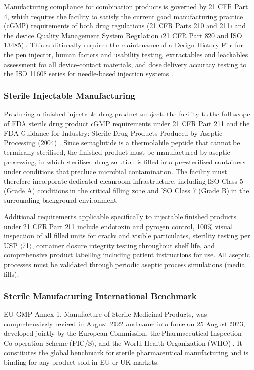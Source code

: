 Manufacturing compliance for combination products is governed by 21 CFR Part 4, which requires the facility to satisfy the current good manufacturing practice (cGMP) requirements of both drug regulations (21 CFR Parts 210 and 211) and the device Quality Management System Regulation (21 CFR Part 820 and ISO 13485) \cite{eCFR_Part4}. This additionally requires the maintenance of a Design History File for the pen injector, human factors and usability testing, extractables and leachables assessment for all device-contact materials, and dose delivery accuracy testing to the ISO 11608 series for needle-based injection systems \cite{FDA_Aseptic_2004}.

\subsubsection{Sterile Injectable Manufacturing}

Producing a finished injectable drug product subjects the facility to the full scope of FDA sterile drug product cGMP requirements under 21 CFR Part 211 and the FDA Guidance for Industry: Sterile Drug Products Produced by Aseptic Processing (2004) \cite{eCFR_211_Sterile}. Since semaglutide is a thermolabile peptide that cannot be terminally sterilised, the finished product must be manufactured by aseptic processing, in which sterilised drug solution is filled into pre-sterilised containers under conditions that preclude microbial contamination. The facility must therefore incorporate dedicated cleanroom infrastructure, including ISO Class 5 (Grade A) conditions in the critical filling zone and ISO Class 7 (Grade B) in the surrounding background environment.

Additional requirements applicable specifically to injectable finished products under 21 CFR Part 211 include endotoxin and pyrogen control, 100\% visual inspection of all filled units for cracks and visible particulates, sterility testing per USP $\langle$71$\rangle$, container closure integrity testing throughout shelf life, and comprehensive product labelling including patient instructions for use. All aseptic processes must be validated through periodic aseptic process simulations (media fills).

\subsubsection{Sterile Manufacturing International Benchmark}

EU GMP Annex 1, Manufacture of Sterile Medicinal Products, was comprehensively revised in August 2022 and came into force on 25 August 2023, developed jointly by the European Commission, the Pharmaceutical Inspection Co-operation Scheme (PIC/S), and the World Health Organization (WHO) \cite{EC_Annex1_2022}. It constitutes the global benchmark for sterile pharmaceutical manufacturing and is binding for any product sold in EU or UK markets.

